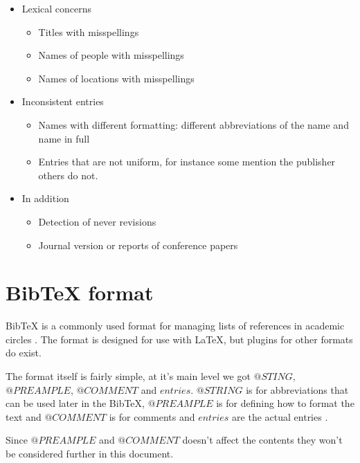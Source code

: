 
\begin{itemize}
\item Lexical concerns
  \begin{itemize}
  \item Titles with misspellings
  \item Names of people with misspellings
  \item Names of locations with misspellings
  \end{itemize}
\item Inconsistent entries
  \begin{itemize}
  \item Names with different formatting: different
    abbreviations of the name and name in full
  \item Entries that are not uniform, for instance some mention the
    publisher others do not.
  \end{itemize}
\item In addition
  \begin{itemize}
  \item Detection of never revisions
  \item Journal version or reports of conference papers
  \end{itemize}
\end{itemize}


\section{Bib{\TeX} format}
Bib{\TeX} is a commonly used format for managing lists of references in
academic circles .  The format is
designed for use with {\LaTeX}, but plugins for other formats do
exist. \autocite{bibtex_resource}

The format itself is fairly simple, at it's main level we got
$@STING$, $@PREAMPLE$, $@COMMENT$ and $entries$.  $@STRING$ is for
abbreviations that can be used later in the Bib{\TeX}, $@PREAMPLE$ is for
defining how to format the text and $@COMMENT$ is for comments and
$entries$ are the actual entries \autocite{bibtex_resource}.

Since $@PREAMPLE$ and $@COMMENT$ doesn't affect the contents they
won't be considered further in this document. 


